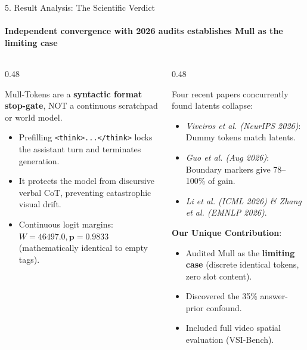 \documentclass[aspectratio=169, 10pt]{beamer}
\begin{document}
\begin{frame}{5. Result Analysis: The Scientific Verdict}
  \framesubtitle{Independent convergence with 2026 audits establishes Mull as the limiting case}
  
  \begin{columns}[T]
    \begin{column}{0.48\textwidth}
      \begin{tcolorbox}[accentcard, title=\textbf{What Mull-Tokens Actually Are}]
        \small
        Mull-Tokens are a \textbf{syntactic format stop-gate}, NOT a continuous scratchpad or world model.
        \vspace{4pt}
        \scriptsize
        \begin{itemize}\setlength{\itemsep}{2pt}
          \item Prefilling \texttt{<think>...</think>} locks the assistant turn and terminates generation.
          \item It protects the model from discursive verbal CoT, preventing catastrophic visual drift.
          \item Continuous logit margins: $W=46497.0, \mathbf{p=0.9833}$ (mathematically identical to empty tags).
        \end{itemize}
      \end{tcolorbox}
    \end{column}
    
    \begin{column}{0.48\textwidth}
      \begin{tcolorbox}[metriccard, title=\textbf{Independent Convergence with 2026 Audits}]
        \scriptsize
        Four recent papers concurrently found latents collapse:
        \begin{itemize}\setlength{\itemsep}{2pt}
          \item \textit{Viveiros et al. (NeurIPS 2026)}: Dummy tokens match latents.
          \item \textit{Guo et al. (Aug 2026)}: Boundary markers give 78--100\% of gain.
          \item \textit{Li et al. (ICML 2026) \& Zhang et al. (EMNLP 2026)}.
        \end{itemize}
        \vspace{2pt}
        \textbf{Our Unique Contribution}:
        \begin{itemize}\setlength{\itemsep}{1pt}
          \item Audited Mull as the \textbf{limiting case} (discrete identical tokens, zero slot content).
          \item Discovered the 35\% answer-prior confound.
          \item Included full video spatial evaluation (VSI-Bench).
        \end{itemize}
      \end{tcolorbox}
    \end{column}
  \end{columns}
\end{frame}
\end{document}

